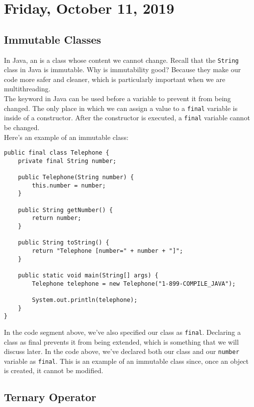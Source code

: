\section{Friday, October 11, 2019}

\subsection{Immutable Classes}

In Java, an  is a class whose content we cannot change. Recall that the \verb!String! class in Java is immutable. Why is immutability good? Because they make our code more safer and cleaner, which is particularly important when we are multithreading. \\

The  keyword in Java can be used before a variable to prevent it from being changed. The only place in which we can assign a value to a \verb!final! variable is inside of a constructor. After the constructor is executed, a \verb!final! variable cannot be changed. \\



Here's an example of an immutable class:

\begin{lstlisting}
public final class Telephone {
	private final String number;

	public Telephone(String number) {
		this.number = number;
	}

	public String getNumber() {
		return number;
	}

	public String toString() {
		return "Telephone [number=" + number + "]";
	}

	public static void main(String[] args) {
		Telephone telephone = new Telephone("1-899-COMPILE_JAVA");

		System.out.println(telephone);
	}
}
\end{lstlisting}

In the code segment above, we've also specified our class as \verb!final!. Declaring a class as final prevents it from being extended, which is something that we will discuss later. In the code above, we've declared both our class and our \verb!number! variable as \verb!final!. This is an example of an immutable class since, once an object is created, it cannot be modified.  \\

\subsection{Ternary Operator}

